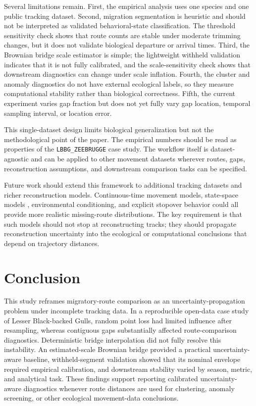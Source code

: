 Several limitations remain. First, the empirical analysis uses one species and one public tracking dataset. Second, migration segmentation is heuristic and should not be interpreted as validated behavioral-state classification. The threshold sensitivity check shows that route counts are stable under moderate trimming changes, but it does not validate biological departure or arrival times. Third, the Brownian bridge scale estimator is simple; the lightweight withheld validation indicates that it is not fully calibrated, and the scale-sensitivity check shows that downstream diagnostics can change under scale inflation. Fourth, the cluster and anomaly diagnostics do not have external ecological labels, so they measure computational stability rather than biological correctness. Fifth, the current experiment varies gap fraction but does not yet fully vary gap location, temporal sampling interval, or location error.

This single-dataset design limits biological generalization but not the methodological point of the paper. The empirical numbers should be read as properties of the \texttt{LBBG\_ZEEBRUGGE} case study. The workflow itself is dataset-agnostic and can be applied to other movement datasets wherever routes, gaps, reconstruction assumptions, and downstream comparison tasks can be specified.

Future work should extend this framework to additional tracking datasets and richer reconstruction models. Continuous-time movement models, state-space models \citep{patterson2008}, environmental conditioning, and explicit stopover behavior could all provide more realistic missing-route distributions. The key requirement is that such models should not stop at reconstructing tracks; they should propagate reconstruction uncertainty into the ecological or computational conclusions that depend on trajectory distances.

\section{Conclusion}\label{conclusion}

This study reframes migratory-route comparison as an uncertainty-propagation problem under incomplete tracking data. In a reproducible open-data case study of Lesser Black-backed Gulls, random point loss had limited influence after resampling, whereas contiguous gaps substantially affected route-comparison diagnostics. Deterministic bridge interpolation did not fully resolve this instability. An estimated-scale Brownian bridge provided a practical uncertainty-aware baseline, withheld-segment validation showed that its nominal envelope required empirical calibration, and downstream stability varied by season, metric, and analytical task. These findings support reporting calibrated uncertainty-aware diagnostics whenever route distances are used for clustering, anomaly screening, or other ecological movement-data conclusions.

